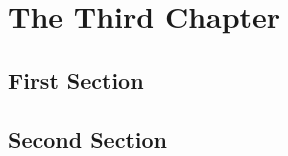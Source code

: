 \chapter{The Third Chapter}
\label{sec:third}
\kant[12-13] %
\section{First Section}
\kant[14]    %
\section{Second Section}
\kant[15]    %